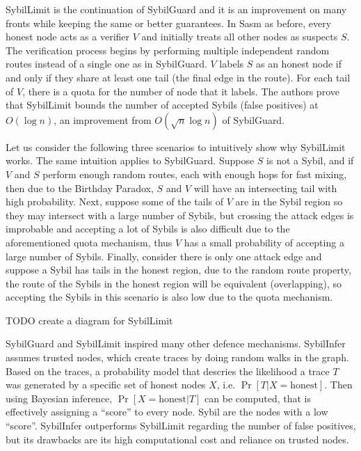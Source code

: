 SybilLimit\cite{yu2008sybillimit} is the continuation of SybilGuard and it is an
improvement on many fronts while keeping the same or better guarantees. In Sasm
as before, every honest node acts as a verifier $V$ and initially treats all
other nodes as suspects $S$. The verification process begins by performing
multiple independent random routes instead of a single one as in SybilGuard. $V$
labels $S$ as an honest node if and only if they share at least one tail (the
final edge in the route). For each tail of $V$, there is a quota for the number
of node that it labels. The authors prove that SybilLimit bounds the number of
accepted Sybils (false positives) at $O(\log{n})$, an improvement from
$O(\sqrt{n} \log{n})$ of SybilGuard.

Let us consider the following three scenarios to intuitively show why SybilLimit
works. The same intuition applies to SybilGuard. Suppose $S$ is not a Sybil, and
if $V$ and $S$ perform enough random routes, each with enough hops for fast
mixing, then due to the Birthday Paradox, $S$ and $V$ will have an intersecting
tail with high probability. Next, suppose some of the tails of $V$ are in the
Sybil region so they may intersect with a large number of Sybils, but crossing
the attack edges is improbable and accepting a lot of Sybils is also difficult
due to the aforementioned quota mechanism, thus $V$ has a small probability of
accepting a large number of Sybils. Finally, consider there is only one attack
edge and suppose a Sybil has tails in the honest region, due to the random route
property, the route of the Sybils in the honest region will be equivalent
(overlapping), so accepting the Sybils in this scenario is also low due to the
quota mechanism.

TODO create a diagram for SybilLimit

SybilGuard and SybilLimit inspired many other defence mechanisms.
SybilInfer\cite{danezis2009sybilinfer} assumes trusted nodes, which create
traces by doing random walks in the graph. Based on the traces, a probability
model that descries the likelihood a trace $T$ was generated by a specific set
of honest nodes $X$, i.e. $\Pr[ T | X = \text{honest}]$. Then using Bayesian
inference, $\Pr[ X = \text{honest}| T ]$ can be computed, that is effectively
assigning a ``score'' to every node. Sybil are the nodes with a low ``score''.
SybilInfer outperforms SybilLimit regarding the number of false positives, but
its drawbacks are its high computational cost and reliance on trusted nodes.

